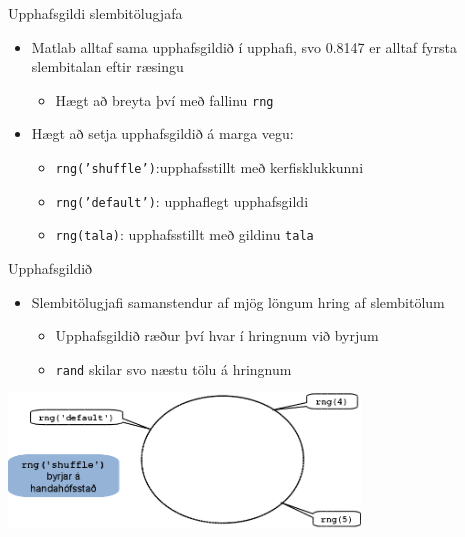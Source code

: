 \documentclass[handout]{beamer}
\begin{document}
\begin{frame}{Upphafsgildi slembitölugjafa}
\begin{itemize}
 \item Matlab alltaf sama upphafsgildið í upphafi, svo 0.8147 er alltaf fyrsta slembitalan eftir ræsingu
 \begin{itemize}
  \item Hægt að breyta því með fallinu \texttt{rng}
 \end{itemize}
 \item Hægt að setja upphafsgildið á marga vegu:
 \begin{itemize}
  \item \texttt{rng('shuffle')}:upphafsstillt með kerfisklukkunni
  \item \texttt{rng('default')}: upphaflegt upphafsgildi
  \item \texttt{rng(tala)}: upphafsstillt með gildinu \texttt{tala}
 \end{itemize}
\end{itemize}
\end{frame}

\begin{frame}[shrink]{Upphafsgildið}
\vspace{1cm}
\begin{itemize}
 \item Slembitölugjafi samanstendur af mjög löngum hring af slembitölum
 \begin{itemize}
  \item Upphafsgildið ræður því hvar í hringnum við byrjum
  \item \texttt{rand} skilar svo næstu tölu á hringnum
 \end{itemize}
\end{itemize}
\begin{center}
\includegraphics[width=0.7\textwidth]{Pics/random-circle}
\end{center}
\end{frame}
\end{document}
